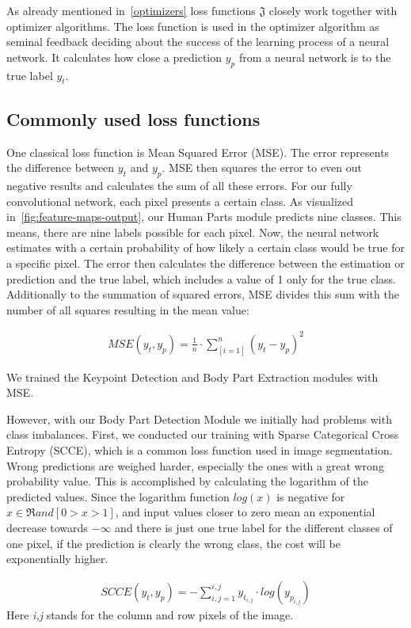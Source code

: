 As already mentioned in~\autoref{optimizers} loss functions $\mathfrak{J}$ closely work together with optimizer algorithms.
The loss function is used in the optimizer algorithm as seminal feedback deciding about the success of the learning process of a
neural network.
It calculates how close a prediction $y_p$ from a neural network is to the true label $y_t$.

\subsection{Commonly used loss functions}
One classical loss function is Mean Squared Error (MSE).
The error represents the difference between $y_t$ and $y_p$.
MSE then squares the error to even out negative results and calculates the sum of all these errors.
For our fully convolutional network, each pixel presents a certain class.
As visualized in~\ref{fig:feature-maps-output}, our Human Parts module predicts nine classes.
This means, there are nine labels possible for each pixel.
Now, the neural network estimates with a certain probability of how likely a certain class would be true for a specific pixel.
The error then calculates the difference between the estimation or prediction and the true label, which includes a
value of 1 only for the true class.
Additionally to the summation of squared errors, MSE divides this sum with the number of all squares resulting in the mean
value:

\begin{align}
    MSE(y_t,y_p) = \frac{1}{n}\cdot\sum_[i=1]^n(y_t-y_p)^2
\end{align}

We trained the Keypoint Detection and Body Part Extraction modules with MSE.

However, with our Body Part Detection Module we initially had problems with class imbalances.
First, we conducted our training with Sparse Categorical Cross Entropy (SCCE), which is a common loss function used in image
segmentation.
Wrong predictions are weighed harder, especially the ones with a great wrong probability value.
This is accomplished by calculating the logarithm of the predicted values.
Since the logarithm function $log(x)$ is negative for $x \in \Re and [0>x>1]$, and input values closer to zero mean
an exponential decrease towards $-\infty$ and there is just one true label for the different classes of one pixel, if
the prediction is clearly the wrong class, the cost will be exponentially higher.

\begin{align}
    SCCE(y_t,y_p) = -\sum_{i,j=1}^{i,j}y_{t_{i,j}}\cdot log(y_{p_{i,j}})
\end{align}
Here \textit{i,j} stands for the column and row pixels of the image.

